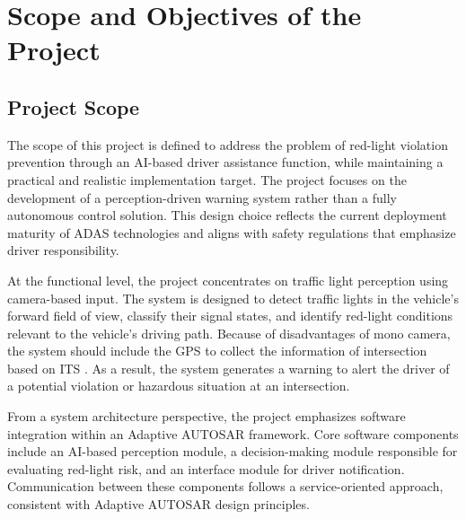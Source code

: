 \section{Scope and Objectives of the Project}

\subsection{Project Scope}




The scope of this project is defined to address the problem of red-light violation prevention through an AI-based driver assistance function, while maintaining a practical and realistic implementation target. The project focuses on the development of a perception-driven warning system rather than a fully autonomous control solution. This design choice reflects the current deployment maturity of ADAS technologies and aligns with safety regulations that emphasize driver responsibility.

At the functional level, the project concentrates on traffic light perception using camera-based input. The system is designed to detect traffic lights in the vehicle’s forward field of view, classify their signal states, and identify red-light conditions relevant to the vehicle’s driving path. Because of disadvantages of mono camera, the system should include the GPS to collect the information of intersection based on ITS \cite{Lee2022TrafficLightRecognition}. As a result, the system generates a warning to alert the driver of a potential violation or hazardous situation at an intersection.

From a system architecture perspective, the project emphasizes software integration within an Adaptive AUTOSAR framework. Core software components include an AI-based perception module, a decision-making module responsible for evaluating red-light risk, and an interface module for driver notification. Communication between these components follows a service-oriented approach, consistent with Adaptive AUTOSAR design principles.


